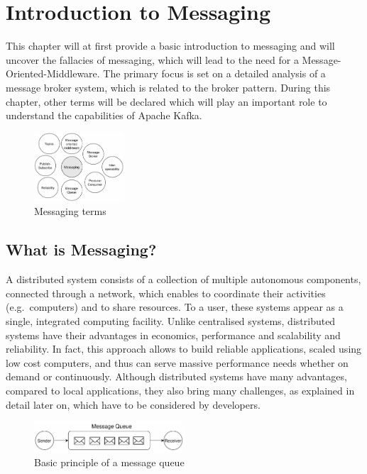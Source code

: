 \chapter{Introduction to Messaging} 

This chapter will at first provide a basic introduction to messaging and will
uncover the fallacies of messaging, which will lead to the need for a
Message-Oriented-Middleware. The primary focus is set on a detailed analysis of a
message broker system, which is related to the broker pattern. During this
chapter, other terms will be declared which will play an important role to
understand the capabilities of Apache Kafka.

\begin{figure}[H]
    \centering
    \includegraphics[width=0.3\textwidth]{images/messaging-intro.png}
    \caption{Messaging terms}
    \label{fig:MBig:the-log}
\end{figure}

\section{What is Messaging?}

A distributed system consists of a collection of multiple autonomous components,
connected through a network, which enables to coordinate  their activities (e.g.\
computers) and to share resources. To a user, these systems appear as a
single, integrated computing facility. Unlike centralised systems,
distributed systems have their advantages in economics, performance and
scalability and reliability. In fact, this approach allows to build reliable
applications, scaled using low cost computers, and thus can serve massive
performance needs whether on demand or continuously.  Although distributed
systems have many advantages, compared to local applications, they also bring
many challenges, as explained in detail later on, which have to be considered by 
developers.\cite{POSA1}\cite{TAN06}

\begin{figure}[H]
    \centering
    \includegraphics[width=0.5\textwidth]{images/messaging-simple.png}
    \caption{Basic principle of a message queue}
    \label{fig:messaging-simple}
\end{figure}

